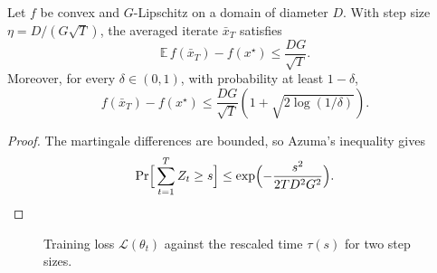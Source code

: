 \begin{theorem}\label{thm:main}
Let $f$ be convex and $G$-Lipschitz on a domain of diameter $D$. With step size $\eta = D/(G\sqrt{T})$, the averaged iterate $\bar{x}_T$ satisfies
\begin{equation}\label{eq:thm}
\mathbb{E}\, f(\bar{x}_T) - f(x^\star) \leq \frac{D G}{\sqrt{T}}.
\end{equation}
Moreover, for every $\delta \in (0,1)$, with probability at least $1-\delta$,
\[
f(\bar{x}_T) - f(x^\star) \leq \frac{DG}{\sqrt{T}} \left(1 + \sqrt{2\log(1/\delta)}\right).
\]
\end{theorem}

\begin{proof}
\proseC
The martingale differences are bounded, so Azuma's inequality gives
\begin{equation*}
\Pr\Bigl[\,\sum_{t=1}^{T} Z_t \geq s\Bigr] \leq \exp\Bigl(-\frac{s^2}{2 T D^2 G^2}\Bigr). \qedhere
\end{equation*}
\end{proof}

\begin{figure}[t]
\centering
{}
\caption{Training loss $\mathcal{L}(\theta_t)$ against the rescaled time $\tau(s)$ for two step sizes.}
\label{fig:loss}
\end{figure}

